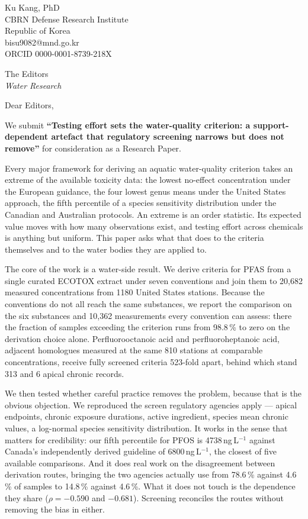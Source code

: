 \documentclass[11pt]{article}
\begin{document}
\noindent Ku Kang, PhD\\
CBRN Defense Research Institute\\
Republic of Korea\\
bisu9082@mnd.go.kr\\
ORCID 0000-0001-8739-218X

\vspace{6mm}
\noindent The Editors\\
\textit{Water Research}

\vspace{6mm}
\noindent Dear Editors,

We submit \textbf{``Testing effort sets the water-quality criterion: a
support-dependent artefact that regulatory screening narrows but does not
remove''} for consideration as a Research Paper.

Every major framework for deriving an aquatic water-quality criterion takes an
extreme of the available toxicity data: the lowest no-effect concentration under
the European guidance, the four lowest genus means under the United States
approach, the fifth percentile of a species sensitivity distribution under the
Canadian and Australian protocols. An extreme is an order statistic. Its
expected value moves with how many observations exist, and testing effort across
chemicals is anything but uniform. This paper asks what that does to the
criteria themselves and to the water bodies they are applied to.

The core of the work is a water-side result. We derive criteria for PFAS from a
single curated ECOTOX extract under seven conventions and join them to 20,682
measured concentrations from 1180 United States stations. Because the
conventions do not all reach the same substances, we report the comparison on
the six substances and 10,362 measurements every convention can assess: there
the fraction of samples exceeding the criterion runs from 98.8\,\% to zero on
the derivation choice alone. Perfluorooctanoic acid and perfluoroheptanoic
acid, adjacent homologues measured at the same 810 stations at comparable
concentrations, receive fully screened criteria 523-fold apart, behind which
stand 313 and 6 apical chronic records.

We then tested whether careful practice removes the problem, because that is
the obvious objection. We reproduced the screen regulatory agencies apply ---
apical endpoints, chronic exposure durations, active ingredient, species mean
chronic values, a log-normal species sensitivity distribution. It works in the
sense that matters for credibility: our fifth percentile for PFOS is
4738\,ng\,L$^{-1}$ against Canada's independently derived guideline of
6800\,ng\,L$^{-1}$, the closest of five available comparisons. And it does
real work on the disagreement between derivation routes, bringing the two
agencies actually use from 78.6\,\% against 4.6\,\% of samples to 14.8\,\%
against 4.6\,\%. What it does not touch is the dependence they share
($\rho = -0.590$ and $-0.681$). Screening reconciles the routes without
removing the bias in either.
\end{document}
